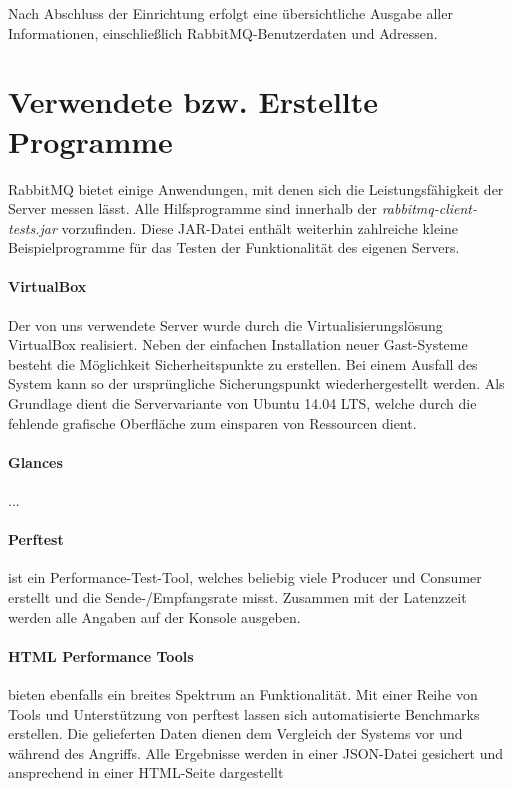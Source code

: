 \documentclass[	a4paper,
			11pt,
			titlepage,
			oneside,
			fleqn,
			listof=totoc,
			parskip,
			chapterprefix=false,
			numbers=noenddot]{scrartcl}
\begin{document}
	Nach Abschluss der Einrichtung erfolgt eine übersichtliche Ausgabe aller Informationen, einschließlich RabbitMQ-Benutzerdaten und Adressen.
	
	
\clearpage
\section*{Verwendete bzw. Erstellte Programme}
	
	RabbitMQ bietet einige Anwendungen, mit denen sich die Leistungsfähigkeit der Server messen lässt. Alle Hilfsprogramme sind innerhalb der \textit{rabbitmq-client-tests.jar} vorzufinden. Diese JAR-Datei enthält weiterhin zahlreiche kleine Beispielprogramme für das Testen der Funktionalität des eigenen Servers. 
	
	\paragraph{VirtualBox} Der von uns verwendete Server wurde durch die Virtualisierungslösung VirtualBox realisiert. Neben der einfachen Installation neuer Gast-Systeme besteht die Möglichkeit Sicherheitspunkte zu erstellen. Bei einem Ausfall des System kann so der ursprüngliche Sicherungspunkt wiederhergestellt werden. Als Grundlage dient die Servervariante von Ubuntu 14.04 LTS, welche durch die fehlende grafische Oberfläche zum einsparen von Ressourcen dient.
	
	\paragraph{Glances} ...
	
	\paragraph{Perftest} ist ein Performance-Test-Tool, welches beliebig viele Producer und Consumer erstellt und die Sende-/Empfangsrate misst. Zusammen mit der Latenzzeit werden alle Angaben auf der Konsole ausgeben.

	\paragraph{HTML Performance Tools} bieten ebenfalls ein breites Spektrum an Funktionalität. Mit einer Reihe von Tools und Unterstützung von perftest lassen sich automatisierte Benchmarks erstellen. Die gelieferten Daten dienen dem Vergleich der Systems vor und während des Angriffs. Alle Ergebnisse werden in einer JSON-Datei gesichert und ansprechend in einer HTML-Seite dargestellt
\end{document}
